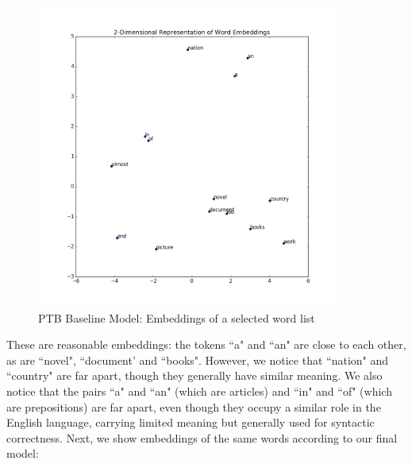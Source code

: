 \documentclass[a4paper]{article}
\begin{document}
\begin{figure}[H]
  \includegraphics[width=10cm]{../plots/PTB_baseline_word_list_embeddings.png}
  \centering
  \caption{PTB Baseline Model: Embeddings of a selected word list}
  \label{fig:ptb1}
\end{figure}
These are reasonable embeddings: the tokens ``a" and ``an" are close to each other, as are ``novel", ``document' and ``books". However, we notice that ``nation" and ``country" are far apart, though they generally have similar meaning. We also notice that the pairs ``a" and ``an" (which are articles) and ``in" and ``of" (which are prepositions) are far apart, even though they occupy a similar role in the English language, carrying limited meaning but generally used for syntactic correctness.
\newline
\newline
Next, we show embeddings of the same words according to our final model:
\end{document}
